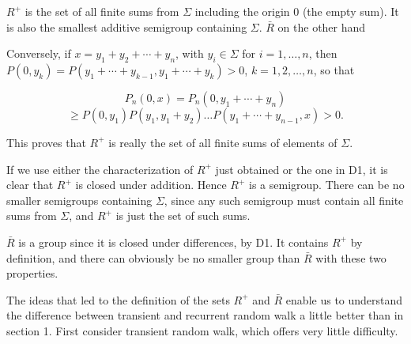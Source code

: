 $R^+$ is the set of all finite sums from $\Sigma$ including the origin 0 (the empty sum). It is also the smallest additive semigroup containing $\Sigma$. $\bar{R}$ on the other hand

Conversely, if $x = y_1 + y_2 + \cdots + y_n$, with $y_i \in \Sigma$ for $i = 1, \ldots, n$, then $P(0, y_k) = P(y_1 + \cdots + y_{k-1}, y_1 + \cdots + y_k) > 0$, $k = 1, 2, \ldots, n$, so that

$$P_n(0, x) = P_n(0, y_1 + \cdots + y_n)$$
$$\geq P(0, y_1)P(y_1, y_1 + y_2) \ldots P(y_1 + \cdots + y_{n-1}, x) > 0.$$

This proves that $R^+$ is really the set of all finite sums of elements of $\Sigma$.

If we use either the characterization of $R^+$ just obtained or the one in D1, it is clear that $R^+$ is closed under addition. Hence $R^+$ is a semigroup. There can be no smaller semigroups containing $\Sigma$, since any such semigroup must contain all finite sums from $\Sigma$, and $R^+$ is just the set of such sums.

$\bar{R}$ is a group since it is closed under differences, by D1. It contains $R^+$ by definition, and there can obviously be no smaller group than $\bar{R}$ with these two properties.

The ideas that led to the definition of the sets $R^+$ and $\bar{R}$ enable us to understand the difference between transient and recurrent random walk a little better than in section 1. First consider transient random walk, which offers very little difficulty.